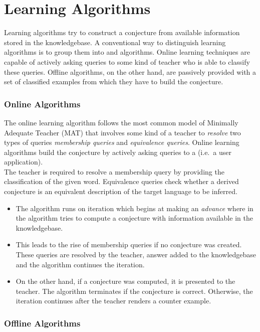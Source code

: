 \chapter{Learning Algorithms}

Learning algorithms try to construct a conjecture from available information stored in the knowledgebase. 
A conventional way to distinguish learning algorithms is to group them into \online and \offline algorithms. Online learning techniques are capable of actively asking queries to some kind of teacher who is able to classify these queries. Offline algorithms, on the other hand, are passively provided with a set of classified examples from which they have to build the conjecture.

\subsection*{Online Algorithms}

 The online learning algorithm follows the most common model of Minimally Adequate Teacher (MAT) that involves some kind of a teacher to  \emph{resolve} two types of queries \emph{membership queries} and \emph{equivalence queries}. Online learning algorithms build the conjecture by actively asking queries to a \teacher (i.e.\ a user application). \\ The teacher is required to resolve a membership query by providing the classification of the given word. Equivalence queries check whether a derived conjecture is an equivalent description of the target language to be inferred.

\begin{itemize}
 \item The algorithm runs on iteration which begins at making an \emph{advance} where in the algorithm tries to compute a conjecture with information available in the knowledgebase.
 \item This leads to the rise of membership queries if no conjecture was created. These queries are resolved by the teacher, answer added to the knowledgebase and the algorithm continues the iteration.
 \item On the other hand, if a conjecture was computed, it is presented to the teacher. The algorithm terminates if the conjecture is correct. Otherwise, the iteration continues after the teacher renders a counter example.
\end{itemize}

\subsection*{Offline Algorithms}    

